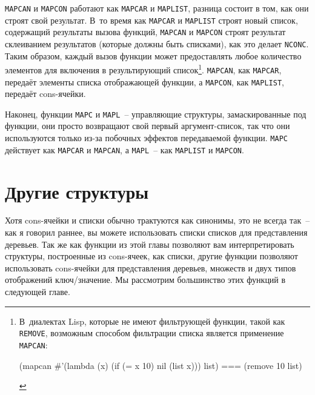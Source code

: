 \lstinline{MAPCAN} и \lstinline{MAPCON} работают как \lstinline{MAPCAR} и \lstinline{MAPLIST}, разница состоит
в том, как они строят свой результат. В~то время как \lstinline{MAPCAR} и \lstinline{MAPLIST} строят
новый список, содержащий результаты вызова функций, \lstinline{MAPCAN} и \lstinline{MAPCON} строят
результат склеиванием результатов (которые должны быть списками), как это делает
\lstinline{NCONC}. Таким образом, каждый вызов функции может предоставлять любое количество
элементов для включения в результирующий список\footnote{В~диалектах Lisp, которые не
  имеют фильтрующей функции, такой как \lstinline{REMOVE}, возможным способом фильтрации списка
  является применение \lstinline{MAPCAN}:

\begin{myverb}
(mapcan #'(lambda (x) (if (= x 10) nil (list x)))  list) === (remove 10 list)
\end{myverb}
}\hspace{\footnotenegspace}. \lstinline{MAPCAN}, как \lstinline{MAPCAR}, передаёт элементы списка отображающей функции, а
\lstinline{MAPCON}, как \lstinline{MAPLIST}, передаёт cons-ячейки.

Наконец, функции \lstinline{MAPC} и \lstinline{MAPL}~-- управляющие структуры, замаскированные под
функции, они просто возвращают свой первый аргумент-список, так что они используются
только из-за побочных эффектов передаваемой функции. \lstinline{MAPC} действует как
\lstinline{MAPCAR} и \lstinline{MAPCAN}, а \lstinline{MAPL}~-- как \lstinline{MAPLIST} и \lstinline{MAPCON}.


\section{Другие структуры}

Хотя cons-ячейки и списки обычно трактуются как синонимы, это не всегда так~-- как я
говорил раннее, вы можете использовать списки списков для представления деревьев. Так же
как функции из этой главы позволяют вам интерпретировать структуры, построенные из
cons-ячеек, как списки, другие функции позволяют использовать cons-ячейки для
представления деревьев, множеств и двух типов отображений ключ/значение. Мы рассмотрим
большинство этих функций в следующей главе.

